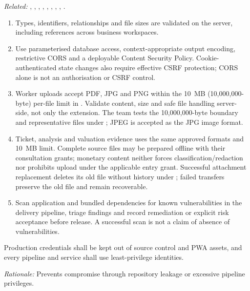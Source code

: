\textit{Related:} \hyperref[fr:001]{}, \hyperref[fr:038]{}, \hyperref[fr:040]{}, \hyperref[fr:045]{}, \hyperref[fr:049]{}, \hyperref[fr:051]{}, \hyperref[fr:053]{}, \hyperref[fr:063]{}, \hyperref[fr:064]{}.
\begin{enumerate}[label=(\alph*),leftmargin=*,itemsep=1pt,topsep=3pt]
\item Types, identifiers, relationships and file sizes are validated on the server, including references across business workspaces.
\item Use parameterised database access, context-appropriate output encoding, restrictive CORS and a deployable Content Security Policy. Cookie-authenticated state changes also require effective CSRF protection; CORS alone is not an authorisation or CSRF control.
\item Worker uploads accept PDF, JPG and PNG within the 10~MB (10,000,000-byte) per-file limit in \hyperref[br:044]{}. Validate content, size and safe file handling server-side, not only the extension. The team tests the 10,000,000-byte boundary and representative files under ; JPEG is accepted as the JPG image format.
\item Ticket, analysis and valuation evidence uses the same approved formats and 10~MB limit. Complete source files may be prepared offline with their consultation grants; monetary content neither forces classification/redaction nor prohibits upload under the applicable entry grant. Successful attachment replacement deletes its old file without history under ; failed transfers preserve the old file and remain recoverable.
\item Scan application and bundled dependencies for known vulnerabilities in the delivery pipeline, triage findings and record remediation or explicit risk acceptance before release. A successful scan is not a claim of absence of vulnerabilities.
\end{enumerate}

\label{nfr:SEC-06}
Production credentials shall be kept out of source control and PWA assets, and every pipeline and service shall use least-privilege identities.

\textit{Rationale:} Prevents compromise through repository leakage or excessive pipeline privileges.

